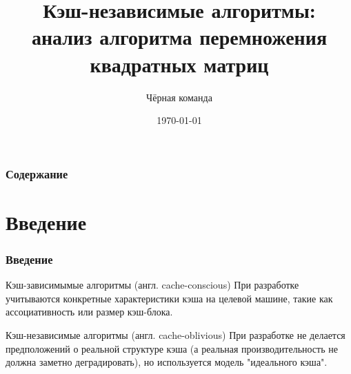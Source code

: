 \documentclass{beamer}
\title[Кэш-независимые алгоритмы]{Кэш-независимые алгоритмы:\\анализ алгоритма перемножения квадратных матриц} %
\author{Чёрная команда} %
\institute[СПбПУ] %
{
Санкт-Петербургский политехнический университет Петра Великого \\ %
\medskip
\textit{Антон Абрамов <abramov91@mail.ru>\\
Владислав Бусаров <happyfanik@yandex.ru>\\
Сергей Дедков <dsv.mail@yandex.ru>\\
Семён Мартынов <semen.martynov@gmail.com>\\
Николай Патраков <noon.vlg@gmail.com>} %
}
\date{\today} %
\begin{document}
\begin{frame}
\titlepage %
\end{frame}

\begin{frame}
\frametitle{Содержание} %
\tableofcontents %
\end{frame}


\section{Введение}

\begin{frame}
\frametitle{Введение}

\begin{block}{Кэш-зависимымые алгоритмы (англ. cache-conscious)}
При разработке учитываются конкретные характеристики кэша на целевой машине, такие как ассоциативность или размер кэш-блока.
\end{block}
\bigskip

\begin{block}{Кэш-независимые алгоритмы (англ. cache-oblivious)}
При разработке не делается предположений о реальной структуре кэша (а реальная производительность не должна заметно деградировать), но используется модель "идеального кэша".
\end{block}

\end{frame}

\end{document}
